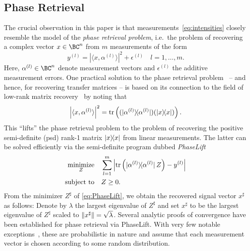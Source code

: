 \subsection{Phase Retrieval}

The crucial observation in this paper is that measurements~\eqref{eq:intensities} closely resemble the model of the \textit{phase retrieval problem}, i.e.\ the problem of recovering a complex vector ${x} \in \BC^n$ from $m$ measurements of the form
\begin{equation}
  y^{(l)} = \left| \langle {x}, \alpha^{(l)} \rangle \right|^2 + \epsilon^{(l)}
  \quad l=1,\ldots,m.
  \label{eq:phase_retrieval_measurements}
\end{equation}
Here, $\alpha^{(l)} \in \BC^n$ denote measurement vectors and $\epsilon^{(l)}$ the additive measurement errors.
One practical solution to the phase retrieval problem~\cite{balan_painless_2009} -- and hence, for recovering transfer matrices -- is based on its connection to the field of low-rank matrix recovery~\cite{ahrero12,candes_exact_2009,capl11,recht_guaranteed_2010,gross_recovering_2011,chen_incoherence_2013} by noting that
\begin{equation}
  \left| \langle {x}, \alpha^{(l)} \rangle \right|^2
  = \tr \left( (\ket{\alpha^{(l)}}\bra{\alpha^{(l)}}) (\ket{{x}}\bra{{x}}) \right).
\end{equation}
This ``lifts'' the phase retrieval problem to the problem of recovering the positive semi-definite (psd) rank-1 matrix $\ket{ x}\bra{ x}$ from linear measurements.
The latter can be solved efficiently via the semi-definite program dubbed \emph{PhaseLift}~\cite{candes_phaselift_2012}
\begin{align}
  \underset{{Z}}{\textrm{minimize}} & \quad \sum_{l=1}^m \left| \tr \left( \ket{\alpha^{(l)}} \bra{\alpha^{(l)}} \, {Z} \right) - y^{(l)} \right| \label{eq:PhaseLift} \\
  \textrm{subject to} &\quad  {Z} \geq 0. \nonumber
\end{align}
From the minimizer ${ Z}^\sharp$ of \cref{eq:PhaseLift}, we obtain the recovered signal vector ${ x}^\sharp$ as follows:
Denote by $\lambda$ the largest eigenvalue of ${ Z}^\sharp$ and set ${ x}^\sharp$ to be the largest eigenvalue of ${ Z}^\sharp$ scaled to ${\Vert{ x}^\sharp\Vert} = \sqrt\lambda$.
Several analytic proofs of convergence have been established for phase retrieval via PhaseLift.
With very few notable exceptions~\cite{Kech_2016_Explicit}, these are probabilistic in nature and assume that each measurement vector is chosen according to some random distribution.
